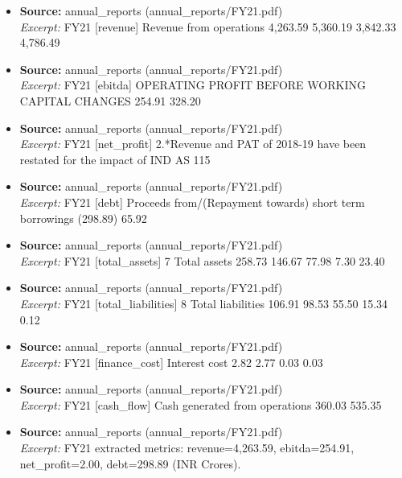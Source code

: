 \documentclass[11pt,a4paper]{article}
\begin{document}
\begin{itemize}
\item \textbf{Source:} annual\_reports (annual\_reports/FY21.pdf) \\ \textit{Excerpt:} FY21 [revenue] Revenue from operations                                       4,263.59             5,360.19             3,842.33            4,786.49
\item \textbf{Source:} annual\_reports (annual\_reports/FY21.pdf) \\ \textit{Excerpt:} FY21 [ebitda] OPERATING PROFIT BEFORE WORKING CAPITAL CHANGES                                                 254.91                 328.20
\item \textbf{Source:} annual\_reports (annual\_reports/FY21.pdf) \\ \textit{Excerpt:} FY21 [net\_profit] 2.*Revenue and PAT of 2018-19 have been restated for the impact of IND AS 115
\item \textbf{Source:} annual\_reports (annual\_reports/FY21.pdf) \\ \textit{Excerpt:} FY21 [debt] Proceeds from/(Repayment towards) short term borrowings                                           (298.89)                    65.92
\item \textbf{Source:} annual\_reports (annual\_reports/FY21.pdf) \\ \textit{Excerpt:} FY21 [total\_assets] 7    Total assets                                  258.73              146.67              77.98                7.30              23.40
\item \textbf{Source:} annual\_reports (annual\_reports/FY21.pdf) \\ \textit{Excerpt:} FY21 [total\_liabilities] 8    Total liabilities                             106.91               98.53              55.50              15.34                0.12
\item \textbf{Source:} annual\_reports (annual\_reports/FY21.pdf) \\ \textit{Excerpt:} FY21 [finance\_cost] Interest cost                                                        2.82             2.77             0.03             0.03
\item \textbf{Source:} annual\_reports (annual\_reports/FY21.pdf) \\ \textit{Excerpt:} FY21 [cash\_flow] Cash generated from operations                                                                   360.03                 535.35
\item \textbf{Source:} annual\_reports (annual\_reports/FY21.pdf) \\ \textit{Excerpt:} FY21 extracted metrics: revenue=4,263.59, ebitda=254.91, net\_profit=2.00, debt=298.89 (INR Crores).

\end{itemize}
\end{document}
